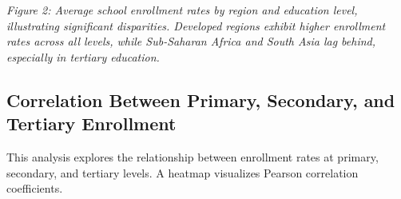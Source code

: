 \documentclass[
  letterpaper,
  DIV=11,
  numbers=noendperiod]{scrartcl}
\begin{document}
\emph{Figure 2: Average school enrollment rates by region and education
level, illustrating significant disparities. Developed regions exhibit
higher enrollment rates across all levels, while Sub-Saharan Africa and
South Asia lag behind, especially in tertiary education.}

\subsection{Correlation Between Primary, Secondary, and Tertiary
Enrollment}\label{correlation-between-primary-secondary-and-tertiary-enrollment}

This analysis explores the relationship between enrollment rates at
primary, secondary, and tertiary levels. A heatmap visualizes Pearson
correlation coefficients.
\end{document}
